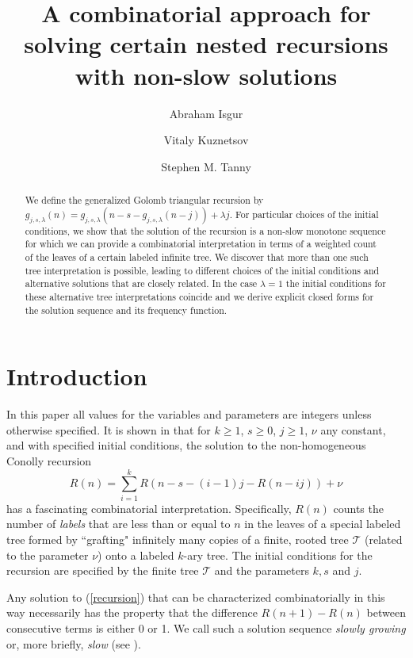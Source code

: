 \documentclass[12pt]{amsart}
\title[Solving a Generalization of Golomb's Nested Triangular Recursion Using Trees]
{A combinatorial approach for solving certain nested recursions with non-slow solutions}
\author[Isgur]{Abraham Isgur}
\author[Kuznetsov]{Vitaly Kuznetsov}
\author[Tanny]{Stephen M. Tanny}
\numberwithin{equation}{section}
\numberwithin{theorem}{section}
\numberwithin{table}{section}
\numberwithin{figure}{section}
\begin{document}
\begin{abstract}
We define the generalized Golomb triangular recursion by
$g_{j,s,\lambda}(n) = g_{j,s,\lambda}(n - s - g_{j,s,\lambda}(n-j)) + \lambda j$.
For particular choices of the initial conditions, we show that the solution of the recursion is a non-slow monotone sequence for which we can provide a combinatorial interpretation in terms of a weighted count of the leaves of a certain labeled infinite tree. We discover that more than one such tree interpretation is possible, leading to different choices of the initial conditions and alternative solutions that are closely related. In the case $\lambda=1$ the initial conditions for these alternative tree interpretations coincide and we derive explicit closed forms for the solution sequence and its frequency function.
\end{abstract}


\maketitle

\section{Introduction} \label{sec1}

In this paper all values for the variables and parameters are integers unless otherwise specified.
It is shown in \cite{NonHomog} that for $k \geq 1$, $s \geq 0$, $j \geq 1$, $\nu$ any constant, and with specified initial conditions, the solution to the non-homogeneous Conolly recursion \begin{equation} \label{recursion} R(n) = \sum_{i=1}^kR(n-s-(i-1)j-R(n-ij))+ \nu \end{equation} has a fascinating combinatorial interpretation. Specifically, $R(n)$ counts the number of \emph{labels} that are less than or equal to $n$ in the leaves of a special labeled tree formed by ``grafting" infinitely many copies of a finite, rooted tree ${\mathcal T}$ (related to the parameter $\nu$) onto a labeled $k$-ary tree. The initial conditions for the recursion are specified by the finite tree ${\mathcal T}$ and the parameters $k,s$ and $j$.

Any solution to (\ref{recursion}) that can be characterized combinatorially in this way necessarily has the property that the difference $R(n+1) - R(n)$ between consecutive terms is either 0 or 1. We call such a solution sequence \emph{slowly growing} or, more briefly, \emph{slow} (see \cite{EIRT, Rpaper, NonHomog}).
\end{document}
